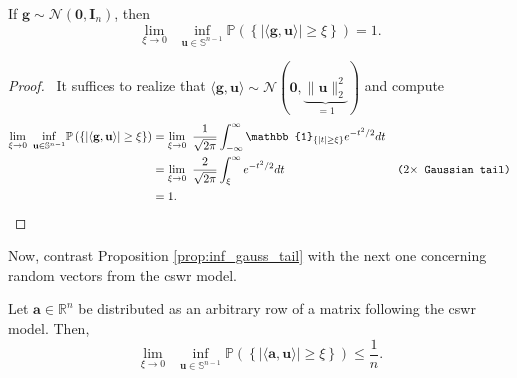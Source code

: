 \begin{proposition}\label{prop:inf_gauss_tail}
    If $\mathbf{g} \sim \mathcal{N}(\mathbf{0}, \mathbf{I}_n)$, then
    \begin{equation}
        \underset{\xi \to 0}{\lim} \enspace \underset{\mathbf{u} \in \mathbb{S}^{n-1}}{\inf} \mathbb{P} \left ( \left \{ | \langle \mathbf{g}, \mathbf{u}\rangle | \geq \xi \right \} \right ) = 1.
    \end{equation}
\end{proposition}

\begin{proof}
    \pf\ It suffices to realize that $\langle \mathbf{g}, \mathbf{u} \rangle \sim \mathcal{N}(\mathbf{0}, \underbrace{\|\mathbf{u}\|_{2}^2}_{=1})$ and compute
    \begin{align*}
        \underset{\xi \to 0}{\lim} \enspace \underset{\mathbf{u} \in \mathbb{S}^{n-1}}{\inf} \mathbb{P} \left ( \left \{ | \langle \mathbf{g}, \mathbf{u}\rangle | \geq \xi \right \} \right ) & = \underset{\xi \to 0}{\lim} \enspace \frac{1}{\sqrt{2\pi}}\int_{-\infty}^{\infty} \mathbb{1}_{\{ |t| \geq \xi \}} e^{-t^2/2} dt \\
        & = \underset{\xi \to 0}{\lim} \enspace \frac{2}{\sqrt{2\pi}}\int_{\xi}^{\infty} e^{-t^2/2} dt & \comment{$2\times$ Gaussian tail}\\
        & = 1.
    \end{align*}
    \hfill\qedsymbol
\end{proof}

Now, contrast Proposition \ref{prop:inf_gauss_tail} with the next one concerning random vectors from the \acrfull{cswr} model.

\begin{proposition}\label{prop:inf_cswr_tail}
    Let $\mathbf{a} \in \mathbb{R}^{n}$ be distributed as an arbitrary row of a matrix following the \acrshort{cswr} model. Then,
    \begin{equation}
        \underset{\xi \to 0}{\lim} \enspace \underset{\mathbf{u} \in \mathbb{S}^{n-1}}{\inf} \mathbb{P} \left ( \left \{ | \langle \mathbf{a}, \mathbf{u}\rangle | \geq \xi \right \} \right ) \leq \frac{1}{n}.
    \end{equation}
\end{proposition}

